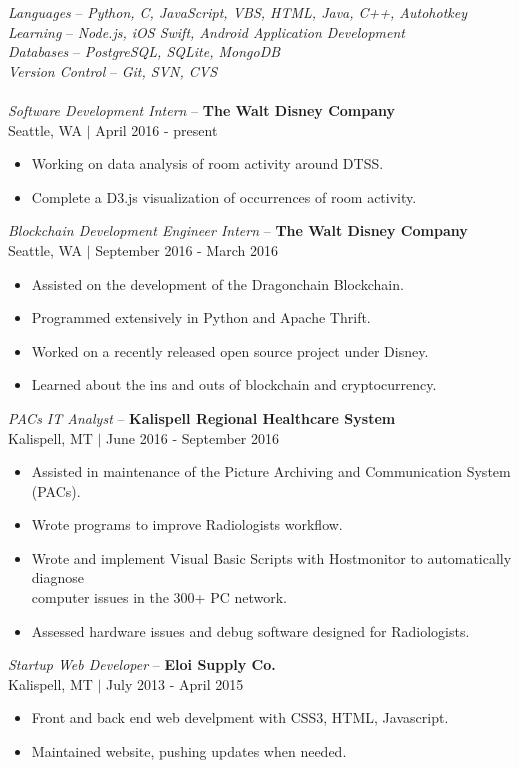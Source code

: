 \documentclass[line,margin]{res}
\begin{document}
\begin{resume}
	{\sl Languages} -- {\sl Python, C, JavaScript, VBS, HTML, Java, C++, Autohotkey} \\
	{\sl Learning} -- {\sl Node.js, iOS Swift, Android Application Development}\\
	{\sl Databases} -- {\sl PostgreSQL, SQLite, MongoDB}\\
	{\sl Version Control} -- {\sl Git, SVN, CVS}\\
	\\
	{\sl Software Development Intern} -- {\bf The Walt Disney Company}\\ 
	{\footnotesize Seattle, WA $|$ April 2016 - present}\\
	\begin{itemize} \itemsep -2pt
		\item Working on data analysis of room activity around DTSS.
		\item Complete a D3.js visualization of occurrences of room activity.
	\end{itemize}
	{\sl Blockchain Development Engineer Intern} -- {\bf The Walt Disney Company}\\ 
	{\footnotesize Seattle, WA $|$ September 2016 - March 2016}\\
	\begin{itemize} \itemsep -2pt
		\item Assisted on the development of the Dragonchain Blockchain.
		\item Programmed extensively in Python and Apache Thrift.
		\item Worked on a recently released open source project under Disney.
		\item Learned about the ins and outs of blockchain and cryptocurrency.
	\end{itemize}
	{\sl PACs IT Analyst} -- {\bf Kalispell Regional Healthcare System} \\
	{\footnotesize Kalispell, MT $|$ June 2016 - September 2016}\\
	\begin{itemize} \itemsep -2pt
		\item Assisted in maintenance of the Picture Archiving and Communication System (PACs).
		\item Wrote programs to improve Radiologists workflow.
		\item Wrote and implement Visual Basic Scripts with Hostmonitor to automatically diagnose \\computer issues in the 300+ PC network.
		\item Assessed hardware issues and debug software designed for Radiologists.
	\end{itemize}
	{\sl Startup Web Developer} -- {\bf Eloi Supply Co.} \\
	{\footnotesize Kalispell, MT $|$  July 2013 - April 2015}\\
	\begin{itemize} \itemsep -2pt
		\item Front and back end web develpment with CSS3, HTML, Javascript.
		\item Maintained website, pushing updates when needed.
	\end{itemize}

\end{resume}
\end{document}
